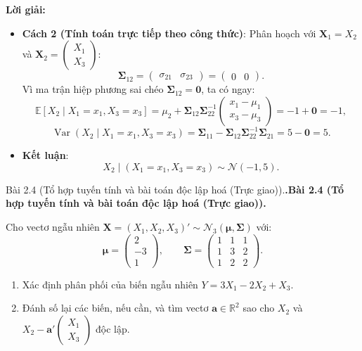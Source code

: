 \documentclass[11pt,a4paper]{article}
\makeatletter
\newcounter{prob}
\newenvironment{problem}[1][]{%
  \par\medskip\noindent
  \def\@tempa{#1}%
  \ifx\@tempa\@empty\refstepcounter{prob}\textbf{\theprob.}\else\textbf{#1}\fi
  \ \ignorespaces
}{\par}
\newenvironment{solution}{%
  \par\noindent\textbf{Lời giải:}\ \ignorespaces
}{\par}
\theoremstyle{definition}
\newcommand{\answer}[1]{\boxed{#1}}
\makeatother
\begin{document}
\begin{solution}
\begin{enumerate}[label=\textbf{\alph*)}]
\begin{itemize}
    \item \textbf{Cách 2 (Tính toán trực tiếp theo công thức)}:
    Phân hoạch với $\mathbf{X}_1 = X_2$ và $\mathbf{X}_2 = \begin{pmatrix} X_1 \\ X_3 \end{pmatrix}$:
    \[
    \boldsymbol{\Sigma}_{12} = \begin{pmatrix} \sigma_{21} & \sigma_{23} \end{pmatrix} = \begin{pmatrix} 0 & 0 \end{pmatrix}.
    \]
    Vì ma trận hiệp phương sai chéo $\boldsymbol{\Sigma}_{12} = \mathbf{0}$, ta có ngay:
    \[
    \mathbb{E}[X_2 \mid X_1 = x_1, X_3 = x_3] = \mu_2 + \boldsymbol{\Sigma}_{12} \boldsymbol{\Sigma}_{22}^{-1} \begin{pmatrix} x_1 - \mu_1 \\ x_3 - \mu_3 \end{pmatrix} = -1 + \mathbf{0} = -1,
    \]
    \[
    \operatorname{Var}(X_2 \mid X_1 = x_1, X_3 = x_3) = \boldsymbol{\Sigma}_{11} - \boldsymbol{\Sigma}_{12}\boldsymbol{\Sigma}_{22}^{-1}\boldsymbol{\Sigma}_{21} = 5 - \mathbf{0} = 5.
    \]
    \item \textbf{Kết luận}:
    \[
    X_2 \mid (X_1 = x_1, X_3 = x_3) \sim \answer{\mathcal{N}(-1, 5)}.
    \]
  \end{itemize}
\end{enumerate}
\end{solution}

\begin{problem}[Bài 2.4 (Tổ hợp tuyến tính và bài toán độc lập hoá (Trực giao)).]
Cho vectơ ngẫu nhiên $\mathbf{X} = (X_1, X_2, X_3)' \sim \mathcal{N}_3(\boldsymbol{\mu}, \boldsymbol{\Sigma})$ với:
\[
\boldsymbol{\mu} = \begin{pmatrix} 2 \\ -3 \\ 1 \end{pmatrix}, \qquad
\boldsymbol{\Sigma} = \begin{pmatrix} 1 & 1 & 1 \\ 1 & 3 & 2 \\ 1 & 2 & 2 \end{pmatrix}.
\]
\begin{enumerate}[label=\alph*)]
  \item Xác định phân phối của biến ngẫu nhiên $Y = 3X_1 - 2X_2 + X_3$.
  \item Đánh số lại các biến, nếu cần, và tìm vectơ $\mathbf{a} \in \mathbb{R}^2$ sao cho $X_2$ và $X_2 - \mathbf{a}' \begin{pmatrix} X_1 \\ X_3 \end{pmatrix}$ độc lập.
\end{enumerate}
\end{problem}
\end{document}
